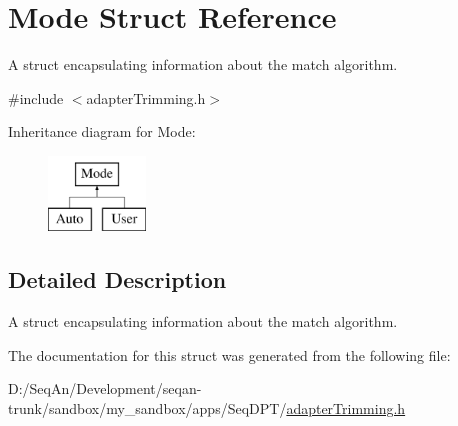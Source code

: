 \hypertarget{struct_mode}{\section{Mode Struct Reference}
\label{struct_mode}
}


A struct encapsulating information about the match algorithm.  




{\ttfamily \#include $<$adapter\-Trimming.\-h$>$}

Inheritance diagram for Mode\-:\begin{figure}[H]
\begin{center}
\leavevmode
\includegraphics[height=2.000000cm]{struct_mode}
\end{center}
\end{figure}


\subsection{Detailed Description}
A struct encapsulating information about the match algorithm. 

The documentation for this struct was generated from the following file\-:\begin{DoxyCompactItemize}
\item 
D\-:/\-Seq\-An/\-Development/seqan-\/trunk/sandbox/my\-\_\-sandbox/apps/\-Seq\-D\-P\-T/\hyperlink{adapter_trimming_8h}{adapter\-Trimming.\-h}\end{DoxyCompactItemize}
